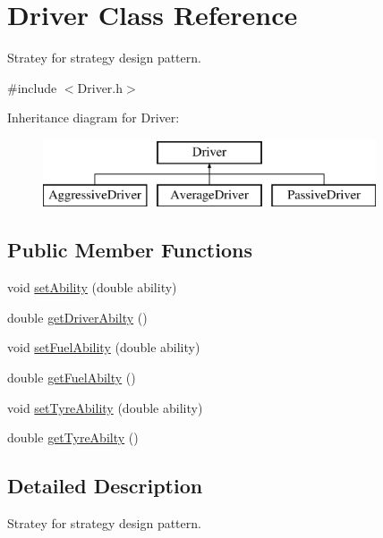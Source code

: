 \hypertarget{class_driver}{}\section{Driver Class Reference}
\label{class_driver}


Stratey for strategy design pattern.  




{\ttfamily \#include $<$Driver.\+h$>$}

Inheritance diagram for Driver\+:\begin{figure}[H]
\begin{center}
\leavevmode
\includegraphics[height=2.000000cm]{class_driver}
\end{center}
\end{figure}
\subsection*{Public Member Functions}
\begin{DoxyCompactItemize}
\item 
void \mbox{\hyperlink{class_driver_a4a9f32db577248f084d1da01d1fab07a}{set\+Ability}} (double ability)
\item 
double \mbox{\hyperlink{class_driver_a8a2b558c11472305bfd73bc7e86b63c0}{get\+Driver\+Abilty}} ()
\item 
void \mbox{\hyperlink{class_driver_aeec270d3160736095047e78018378864}{set\+Fuel\+Ability}} (double ability)
\item 
double \mbox{\hyperlink{class_driver_af41b8ce4a24f7664fca47406d3039657}{get\+Fuel\+Abilty}} ()
\item 
void \mbox{\hyperlink{class_driver_a52a0784b8b88c417271e99b4b2f8bf37}{set\+Tyre\+Ability}} (double ability)
\item 
double \mbox{\hyperlink{class_driver_a28a8c99e436c186b6f6e60f5c91aec8f}{get\+Tyre\+Abilty}} ()
\end{DoxyCompactItemize}


\subsection{Detailed Description}
Stratey for strategy design pattern. 

